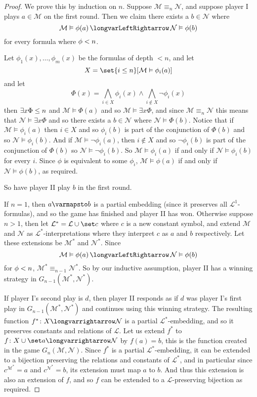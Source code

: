 \documentclass[10pt]{article}
\def\iff{\,\longvarLeftRightarrow\,}
\let\longto=\longvarrightarrow
\def\mL{\mathcal{L}}
\def\mM{\mathcal{M}}
\def\mN{\mathcal{N}}
\begin{document}
\begin{proof}

    We prove this by induction on $n$.
    Suppose $\mM\equiv_n\mN$, and suppose player I plays $a\in\mM$ on the first round.
    Then we claim there exists a $b\in\mN$ where
    \[ \mM\vDash\phi(a) \iff \mN\vDash\phi(b) \]
    for every formula where $\depthof\phi<n$.

    Let $\phi_1(x),\dots,\phi_m(x)$ be the formulas of depth $<n$, and let
    \[ X = \set{i\leq n}[\mM\vDash\phi_i(a)] \]
    and let
    \[ \Phi(x) = \bigwedge_{i\in X}\phi_i(x)\land\bigwedge_{i\notin X}\neg\phi_i(x) \]
    then $\depthof{\exists x\Phi}\leq n$ and $\mM\vDash\Phi(a)$ and so $\mM\vDash\exists x\Phi$, and since $\mM\equiv_n\mN$ this means that $\mN\vDash\exists x\Phi$ and so there exists a $b\in\mN$ where
    $\mN\vDash\Phi(b)$.
    Notice that if $\mM\vDash\phi_i(a)$ then $i\in X$ and so $\phi_i(b)$ is part of the conjunction of $\Phi(b)$ and so $\mN\vDash\phi_i(b)$.
    And if $\mM\vDash\neg\phi_i(a)$, then $i\notin X$ and so $\neg\phi_i(b)$ is part of the conjunction of $\Phi(b)$ so $\mN\vDash\neg\phi_i(b)$.
    So $\mM\vDash\phi_i(a)$ if and only if $\mN\vDash\phi_i(b)$ for every $i$.
    Since $\phi$ is equivalent to some $\phi_i$, $\mM\vDash\phi(a)$ if and only if $\mN\vDash\phi(b)$, as required.

    So have player II play $b$ in the first round.

    If $n=1$, then $a\varmapsto b$ is a partial embedding (since it preserves all $\mL^1$-formulas), and so the game has finished and player II has won.
    Otherwise suppose $n>1$, then let $\mL^*=\mL\cup\set c$ where $c$ is a new constant symbol, and extend $\mM$ and $\mN$ as $\mL^*$-interpretations where they interpret $c$ as $a$ and $b$ respectively.
    Let these extensions be $\mM^*$ and $\mN^*$.
    Since
    \[ \mM\vDash\phi(a) \iff \mN\vDash\phi(b) \]
    for $\depthof\phi<n$, $\mM^*\equiv_{n-1}\mN^*$.
    So by our inductive assumption, player II has a winning strategy in $G_{n-1}(\mM^*,\mN^*)$.

    If player I's second play is $d$, then player II responds as if $d$ was player I's first play in $G_{n-1}(\mM^*,\mN^*)$ and continues using this winning strategy.
    The resulting function $f^*\colon X\longto\mN$ is a partial $\mL^*$-embedding, and so it preserves constants and relations of $\mL$.
    Let us extend $f^*$ to $f\colon X\cup\set a\longto\mN$ by $f(a)=b$, this is the function created in the game $G_n(\mM,\mN)$.
    Since $f^*$ is a partial $\mL^*$-embedding, it can be extended to a bijection preserving the relations and constants of $\mL^*$, and in particular since $c^{\mM^*}=a$ and $c^{\mN^*}=b$, its extension
    must map $a$ to $b$.
    And thus this extension is also an extension of $f$, and so $f$ can be extended to a $\mL$-preserving bijection as required.


\end{proof}
\end{document}
